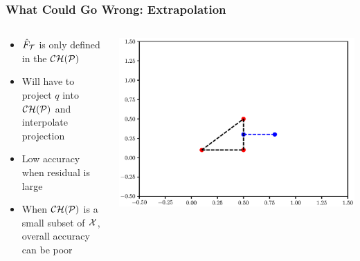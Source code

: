 \documentclass[aspectratio=169]{beamer}
\begin{document}
\begin{frame}\frametitle{What Could Go Wrong: Extrapolation}
\begin{columns}
\begin{column}{0.6\textwidth}
\begin{itemize}
\pause
\item ${\hat F}_{\cal T}$ is only defined in the ${\cal CH}({\cal P})$
\item Will have to project $q$ into ${\cal CH}({\cal P})$ and interpolate
projection
\item {\color{red} Low accuracy when residual is large}
\item When ${\cal CH}({\cal P})$ is a small subset of ${\cal X}$,
overall accuracy can be poor
\end{itemize}
\end{column}
\begin{column}{0.4\textwidth}
\includegraphics[width=\textwidth]{projection.eps}
\end{column}
\end{columns}
\end{frame}
\end{document}
